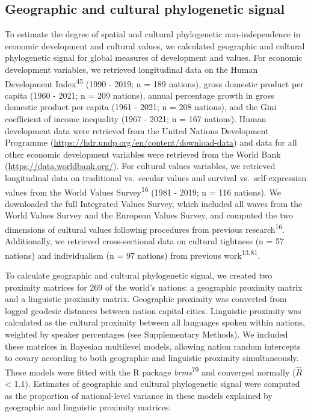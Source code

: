 \documentclass[
  man,floatsintext]{apa6}
\begin{document}
\hypertarget{geographic-and-cultural-phylogenetic-signal}{%
\subsection{Geographic and cultural phylogenetic signal}\label{geographic-and-cultural-phylogenetic-signal}}

To estimate the degree of spatial and cultural phylogenetic non-independence in economic development and cultural values, we calculated geographic and cultural phylogenetic signal for global measures of development and values. For economic development variables, we retrieved longitudinal data on the Human Development Index\textsuperscript{45} (1990 - 2019; n = 189 nations), gross domestic product per capita (1960 - 2021; n = 209 nations), annual percentage growth in gross domestic product per capita (1961 - 2021; n = 208 nations), and the Gini coefficient of income inequality (1967 - 2021; n = 167 nations). Human development data were retrieved from the United Nations Development Programme (\url{https://hdr.undp.org/en/content/download-data}) and data for all other economic development variables were retrieved from the World Bank (\url{https://data.worldbank.org/}). For cultural values variables, we retrieved longitudinal data on traditional vs.~secular values and survival vs.~self-expression values from the World Values Survey\textsuperscript{16} (1981 - 2019; n = 116 nations). We downloaded the full Integrated Values Survey, which included all waves from the World Values Survey and the European Values Survey, and computed the two dimensions of cultural values following procedures from previous research\textsuperscript{16}. Additionally, we retrieved cross-sectional data on cultural tightness (n = 57 nations) and individualism (n = 97 nations) from previous work\textsuperscript{13,81}.

To calculate geographic and cultural phylogenetic signal, we created two proximity matrices for 269 of the world's nations: a geographic proximity matrix and a linguistic proximity matrix. Geographic proximity was converted from logged geodesic distances between nation capital cities. Linguistic proximity was calculated as the cultural proximity between all languages spoken within nations, weighted by speaker percentages (see Supplementary Methods). We included these matrices in Bayesian multilevel models, allowing nation random intercepts to covary according to both geographic and linguistic proximity simultaneously. These models were fitted with the R package \emph{brms}\textsuperscript{79} and converged normally (\(\hat{R}\) \textless{} 1.1). Estimates of geographic and cultural phylogenetic signal were computed as the proportion of national-level variance in these models explained by geographic and linguistic proximity matrices.
\end{document}
